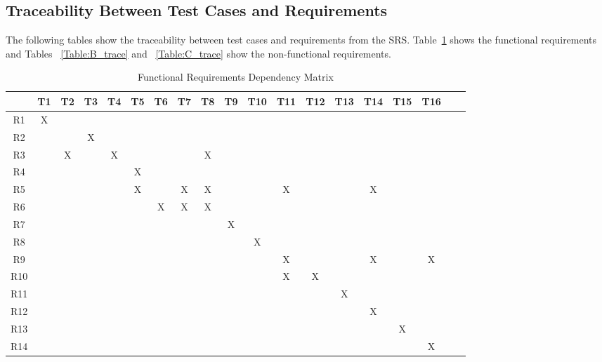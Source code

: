 \documentclass[12pt, titlepage]{article}
\begin{document}
\subsection{Traceability Between Test Cases and Requirements}

The following tables show the traceability between test cases and requirements from the SRS. Table~\ref{Table:A_trace} shows the functional requirements and Tables ~\ref{Table:B_trace} and ~\ref{Table:C_trace} show the non-functional requirements.

\begin{table}[H]
  \centering
  \caption{Functional Requirements Dependency Matrix}
  \begin{tabular}{|c|c|c|c|c|c|c|c|c|c|c|c|c|c|c|c|c|c|c|}
  \hline
  & T1 & T2 & T3 & T4 & T5 & T6 & T7 & T8 & T9 & T10 & T11 & T12 & T13 & T14 & T15 & T16\\
  \hline
  R1      &X & & & & & & & & & & & & & & & \\ 
  \hline
  R2      & & &X & & & & & & & & & & & & &  \\ 
  \hline
  R3      & &X & &X & & & &X & & & & & & & &  \\ 
  \hline
  R4      & & & & &X & & & & & & & & &  & & \\ 
  \hline
  R5      & & & & &X & &X &X & & &X & & &X & &  \\ 
  \hline
  R6      & & & & & &X &X &X & & & & & & & &  \\ 
  \hline
  R7      & & & & & & & & &X & & & & &  & & \\ 
  \hline
  R8      & & & & & & & & & & X& & & & & &  \\ 
  \hline
  R9      & & & & & & & & & & &X & & & X& &X  \\ 
  \hline
  R10      & & & & & & & & & & &X &X & & & &  \\ 
  \hline
  R11      & & & & & & & & & & & & &X & & &   \\ 
  \hline
  R12      & & & & & & & & & & & & & &X & &   \\ 
  \hline
  R13      & & & & & & & & & & & & & & &X &  \\ 
  \hline
  R14      & & & & & & & & & & & & & & & & X  \\ 
  \hline
  
  \end{tabular}
  
  \label{Table:A_trace}
  \end{table}
  
\end{document}
